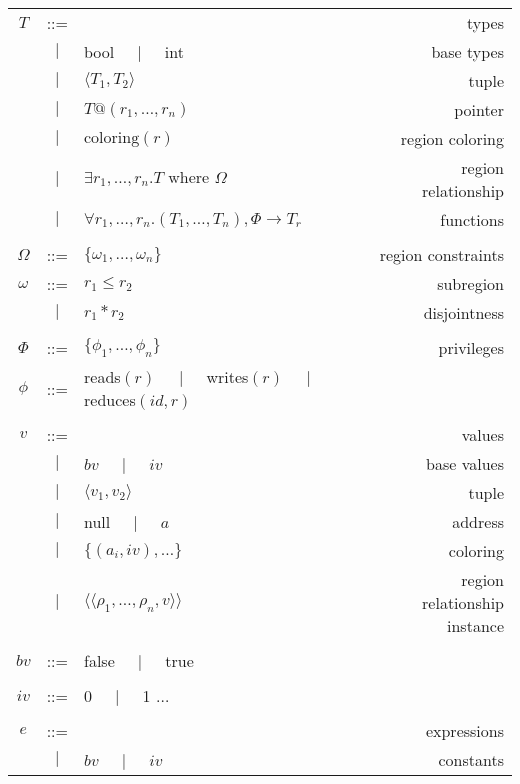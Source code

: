 \newcommand{\oton}[1]{{#1}_1,\ldots,{#1}_n}
\newcommand{\otok}[2]{{#2}_1,\ldots,{#2}_{#1}}
\newcommand{\dplus}{\text{++}}

\begin{table*}
\centering
{\small
\begin{tabular}{cclr}

$T$ & ::= &  & types \\
  &$\mid$& bool $\;\;\;\mid\;\;\;$ int & base types \\
  &$\mid$& $\langle T_1, T_2 \rangle$ & tuple \\
  &$\mid$& $T@(\oton{r})$ & pointer \\
  &$\mid$& $\text{coloring}(r)$ & region coloring \\
  &$\mid$& $\exists \oton{r}. T\text{ where }\Omega$ & region relationship \\
  &$\mid$& $\forall \oton{r}. (\oton{T}), \Phi \rightarrow T_r$ & functions \\
\\
$\Omega$ & ::= & $\{ \oton{\omega} \}$ & region constraints \\
$\omega$ & ::= & $r_1 \leq r_2$ & subregion \\
  &$\mid$& $r_1 * r_2$ & disjointness \\
\\
$\Phi$ & ::= & $\{ \oton{\phi} \}$ & privileges \\
$\phi$ & ::= & reads$(r)$ $\;\;\;\mid\;\;\;$ writes$(r)$ $\;\;\;\mid\;\;\;$ reduces$(id,r)$ & \\
\\
$v$ & ::= & & values \\
  &$\mid$& $bv$ $\;\;\;\mid\;\;\;$ $iv$ & base values \\
  &$\mid$& $\langle v_1, v_2 \rangle$ & tuple \\
  &$\mid$& null $\;\;\;\mid\;\;\;$ $a$ & address \\
  &$\mid$& $\{ (a_i, iv), \ldots \}$ & coloring \\
  &$\mid$& $\langle \langle \oton{\rho}, v\rangle \rangle$ & region relationship instance \\
\\
$bv$ & ::= & false $\;\;\;\mid\;\;\;$ true \\
\\
$iv$ & ::= & 0 $\;\;\;\mid\;\;\;$ 1 $\ldots$ \\
\\
$e$ & ::= & & expressions \\
  &$\mid$& $bv$ $\;\;\;\mid\;\;\;$ $iv$ & constants \\

\end{tabular}}
\end{table*}
